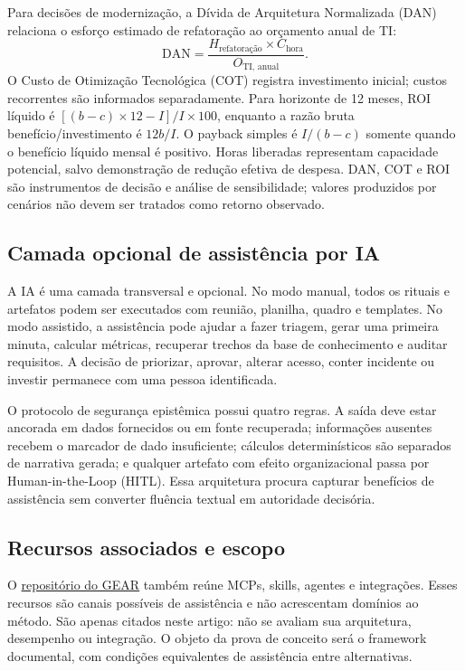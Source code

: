 Para decisões de modernização, a Dívida de Arquitetura Normalizada (DAN) relaciona o esforço estimado de refatoração ao orçamento anual de TI:
\begin{equation}
  \mathrm{DAN}=\frac{H_{\text{refatoração}}\times C_{\text{hora}}}{O_{\text{TI, anual}}}.
\end{equation}
O Custo de Otimização Tecnológica (COT) registra investimento inicial; custos recorrentes são informados separadamente. Para horizonte de 12 meses, ROI líquido é $[(b-c)\times12-I]/I\times100$, enquanto a razão bruta benefício/investimento é $12b/I$. O payback simples é $I/(b-c)$ somente quando o benefício líquido mensal é positivo. Horas liberadas representam capacidade potencial, salvo demonstração de redução efetiva de despesa. DAN, COT e ROI são instrumentos de decisão e análise de sensibilidade; valores produzidos por cenários não devem ser tratados como retorno observado.

\subsection{Camada opcional de assistência por IA}

A IA é uma camada transversal e opcional. No modo manual, todos os rituais e artefatos podem ser executados com reunião, planilha, quadro e templates. No modo assistido, a assistência pode ajudar a fazer triagem, gerar uma primeira minuta, calcular métricas, recuperar trechos da base de conhecimento e auditar requisitos. A decisão de priorizar, aprovar, alterar acesso, conter incidente ou investir permanece com uma pessoa identificada.

O protocolo de segurança epistêmica possui quatro regras. A saída deve estar ancorada em dados fornecidos ou em fonte recuperada; informações ausentes recebem o marcador de dado insuficiente; cálculos determinísticos são separados de narrativa gerada; e qualquer artefato com efeito organizacional passa por Human-in-the-Loop (HITL). Essa arquitetura procura capturar benefícios de assistência sem converter fluência textual em autoridade decisória.

\subsection{Recursos associados e escopo}

O \href{https://github.com/andrecodexvictor/GP-Pme/tree/codex/gear-editorial}{repositório do GEAR} também reúne MCPs, skills, agentes e integrações. Esses recursos são canais possíveis de assistência e não acrescentam domínios ao método. São apenas citados neste artigo: não se avaliam sua arquitetura, desempenho ou integração. O objeto da prova de conceito será o framework documental, com condições equivalentes de assistência entre alternativas.
